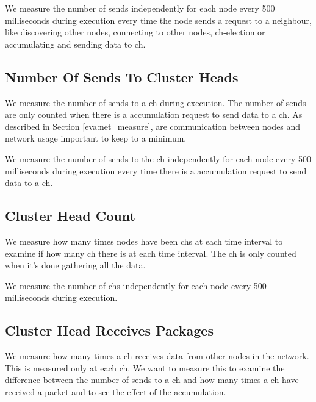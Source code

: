 \documentclass[USenglish]{uit-thesis}
\begin{document}
We measure the number of sends independently for each node every 500 milliseconds during execution every time the node sends a request to a neighbour, like discovering other nodes, connecting to other nodes, \gls{ch}-election or accumulating and sending data to \gls{ch}.


\subsection{Number Of Sends To Cluster Heads} \label{eva:num_sends_ch}
We measure the number of sends to a \gls{ch} during execution. The number of sends are only counted when there is a accumulation request to send data to a \gls{ch}. As described in Section \ref{eva:net_measure}, are communication between nodes and network usage important to keep to a minimum.



We measure the number of sends to the \gls{ch} independently for each node every 500 milliseconds during execution every time there is a accumulation request to send data to a \gls{ch}.


\subsection{Cluster Head Count} \label{eva:ch_count}
We measure how many times nodes have been \glspl{ch} at each time interval to examine if how many \gls{ch} there is at each time interval. The \gls{ch} is only counted when it's done gathering all the data.

We measure the number of \glspl{ch} independently for each node every 500 milliseconds during execution.


\subsection{Cluster Head Receives Packages} \label{eva:ch_recv}
We measure how many times a \gls{ch} receives data from other nodes in the network. This is measured only at each \gls{ch}. We want to measure this to examine the difference between the number of sends to a \gls{ch} and how many times a \gls{ch} have received a packet and to see the effect of the accumulation.
\end{document}
